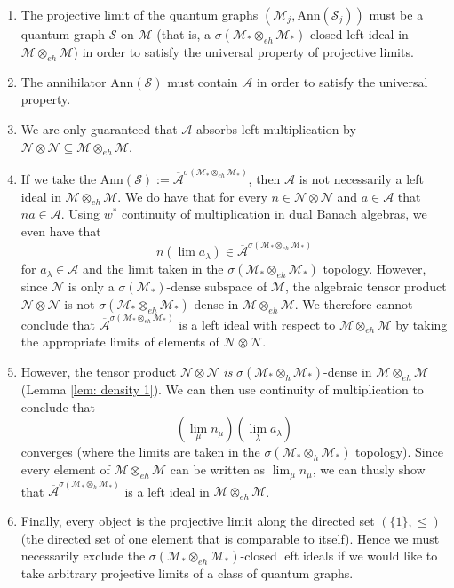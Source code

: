 \documentclass[12pt]{article}
\theoremstyle{definition}
\newcommand{\mc}[1]{\mathcal{#1}}
\newcommand{\<}{\langle}
\renewcommand{\>}{\rangle}
\newcommand{\Ann}{\text{Ann}}
\renewcommand{\subset}{\subseteq}
\newcommand{\eh}{\otimes_{eh}}
\newcommand{\h}{\otimes_{h}}
\begin{document}
\begin{enumerate}
    \item The projective limit of the quantum graphs $(\mc M_j, \Ann(\mc S_j))$ must be a quantum graph $\mc S$ on $\mc M$ (that is, a $\sigma(\mc M_* \eh \mc M_*)$-closed left ideal in $\mc M \eh \mc M$) in order to satisfy the universal property of projective limits.
    \item The annihilator $\Ann(\mc S)$ must contain $\mc A$ in order to satisfy the universal property.
    \item We are only guaranteed that $\mc A$ absorbs left multiplication by $\mc N \otimes \mc N \subset \mc M \eh \mc M$. 
    \item If we take the $\Ann(\mc S) := \overline{\mc A}^{\sigma(\mc M_* \eh \mc M_*)}$, then $\mc A$ is not necessarily a left ideal in $\mc M \eh \mc M$. We do have that for every $n \in \mc N \otimes \mc N$ and $a \in \mc A$ that $na \in \mc A$. Using $w^*$ continuity of multiplication in dual Banach algebras, we even have that 
    \[
    n (\lim a_\lambda) \in \overline{\mc A}^{\sigma(\mc M_* \eh \mc M_*)}
    \]
    for $a_\lambda \in \mc A$ and the limit taken in the $\sigma(\mc M_* \eh \mc M_*)$ topology. However, since $\mc N$ is only a $\sigma(\mc M_*)$-dense subspace of $\mc M$, the algebraic tensor product $\mc N \otimes \mc N$ is not $\sigma(\mc M_* \eh \mc M_*)$-dense in $\mc M \eh \mc M$. We therefore cannot conclude that $\overline{\mc A}^{\sigma(\mc M_* \eh \mc M_*)}$ is a left ideal with respect to $\mc M \eh \mc M$ by taking the appropriate limits of elements of $\mc N \otimes \mc N$.
    \item However, the tensor product $\mc N \otimes \mc N$ \textit{is} $\sigma(\mc M_* \otimes_h \mc M_*)$-dense in $\mc M \eh \mc M$ (Lemma \ref{lem: density 1}). We can then use continuity of multiplication to conclude that 
    \[
    (\lim_\mu n_\mu )(\lim_\lambda a_\lambda )
    \]
    converges (where the limits are taken in the $\sigma(\mc M_* \otimes_h \mc M_*)$ topology). Since every element of $\mc M \eh \mc M$ can be written as $\lim_\mu n_\mu$, we can thusly show that $\overline{\mc A}^{\sigma(\mc M_* \h \mc M_*)}$ is a left ideal in $\mc M \eh \mc M$.
    \item Finally, every object is the projective limit along the directed set $(\{1\}, \leq)$ (the directed set of one element that is comparable to itself). Hence we must necessarily exclude the $\sigma(\mc M_* \eh \mc M_*)$-closed left ideals if we would like to take arbitrary projective limits of a class of quantum graphs. 
\end{enumerate}
\end{document}
